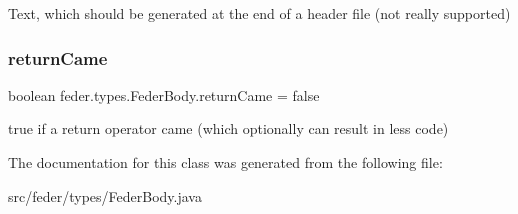 Text, which should be generated at the end of a header file (not really supported) \mbox{\label{classfeder_1_1types_1_1FederBody_a4602832966e1e3fa19cf19f06a69aa07}} 
\subsubsection{\texorpdfstring{return\+Came}{returnCame}}
{\footnotesize\ttfamily boolean feder.\+types.\+Feder\+Body.\+return\+Came = false}

true if a \textquotesingle{}return\textquotesingle{} operator came (which optionally can result in less code) 

The documentation for this class was generated from the following file\+:\begin{DoxyCompactItemize}
\item 
src/feder/types/Feder\+Body.\+java\end{DoxyCompactItemize}
